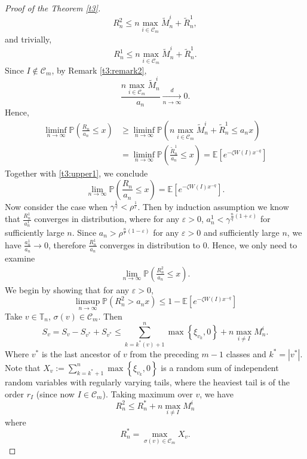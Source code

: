 \documentclass[12pt]{article}
\numberwithin{equation}{section}
\newcommand{\E}{\mathbb{E}}
\begin{document}
\begin{proof}[Proof of the Theorem \ref{t3}]
\[
R^2_n \leq  n\max_{i \in \mathcal{C}_m}\tilde{M}^i_n + \tilde{R}^1_n,
\]
and trivially,
\[
R^1_n \leq  n\max_{i \in \mathcal{C}_m}\tilde{M}^i_n + \tilde{R}^1_n.
\]
Since $I \notin \mathcal{C}_m $, by Remark \ref{t3:remark2}, 
\[\frac{n\max_{i \in \mathcal{C}_m}\tilde{M}^i_n} {a_n} \xrightarrow[n \rightarrow \infty]{d} 0.\]  Hence, 
\begin{align*}
\liminf_{n \rightarrow \infty}\mathbb{P}\left(\frac {R_n} {a_n} \leq x\right) &\geq \liminf_{n \rightarrow \infty} \mathbb{P} \left( n\max_{i \in \mathcal{C}_m}\tilde{M}^i_n + \tilde{R}^1_n  \leq a_n x\right) \\&= \liminf_{n \rightarrow \infty}\mathbb{P}\left(\frac {\tilde{R}^1_n} {a_n} \leq x\right) =  \E[e^{-\zeta W(I)x^{-q}}]
\end{align*}
Together with \eqref{t3:upper1}, we conclude 
\[
\lim_{n\rightarrow \infty}\mathbb{P}\left(\frac {R_n} {a_n} \leq x\right) =  \E[e^{-\zeta W(I)x^{-q}}].
\]
Now consider the case when $\gamma^{\frac 1 q} < \rho^{\frac 1 r}$. Then by induction assumption we know that $\frac {R^1_n} {a^1_n}$ converges in distribution, where for any $\varepsilon >0$, $a^1_n < \gamma^{\frac n q (1+\varepsilon)}$ for sufficiently large $n$. Since $a_n >  \rho^{\frac n r (1-\varepsilon)}$ for any $\varepsilon >0$ and sufficiently large $n$, we have $\frac{a^1_n} {a_n} \rightarrow 0$, therefore $\frac {R^1_n} {a_n}$ converges in distribution to $0$. 
Hence, we only need to examine 
\begin{align}
\lim_{n\rightarrow \infty}\mathbb{P}\left(\frac {R^2_n} {a_n} \leq x\right).
\end{align}
We begin by showing that for any $\varepsilon > 0$,
  \begin{equation}\label{t3:upperbound}
            \limsup_{n \rightarrow \infty}  \mathbb{P} \left( R^2_n > a_n x\right)\leq 1- \E[e^{-\zeta W(I)x^{-q}}]
    \end{equation}
Take $v \in \mathbb{T}_n$, $\sigma(v) \in \mathcal{C}_m$. Then
\[
S_v = S_v - S_{v^*} + S_{v^*} \leq \sum_{k=k^*(v) + 1}^{n}\max\left\{\xi_{v_{k}},0\right\} + n\max\limits_{i \neq I} M^i_n.
\]
Where $v^*$ is the last ancestor of $v$ from the preceding $m-1$ classes and $k^* = |v^*|$. Note that $X_v := \sum_{k=k^* + 1}^{n}\max\left\{\xi_{v_{k}},0\right\}$ is a random sum of independent random variables with regularly varying tails, where the heaviest tail is of the order $r_I$ (since now $I \in \mathcal{C}_m$). Taking maximum over $v$, we have
\[
R^2_n \leq R^*_n + n\max\limits_{i \neq I}M^i_n
\]
where \[R^*_n = \max_{\sigma(v) \in \mathcal{C}_m}X_v.\] 

\end{proof}
\end{document}
